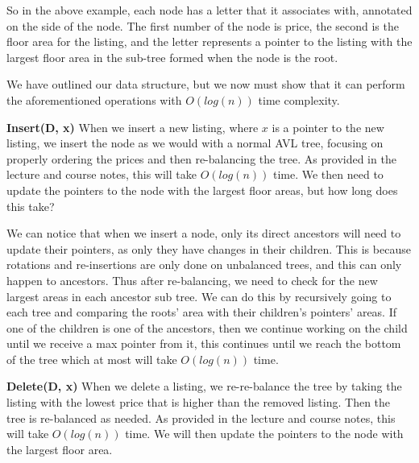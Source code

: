 \documentclass[20pt]{article}
\begin{document}
\noindent
\begin{text}
    So in the above example, each node has a letter that it associates with, annotated on the side of the node. The first number of the node is price, the second is the floor area for the listing, and the letter represents a pointer to the listing with the largest floor area in the sub-tree formed when the node is the root.
\end{text}

\noindent
\begin{text}
    We have outlined our data structure, but we now must show that it can perform the aforementioned operations with $O(log(n))$ time complexity.
    
    \noindent
    \textbf{Insert(D, x)}
    When we insert a new listing, where $x$ is a pointer to the new listing, we insert the node as we would with a normal AVL tree, focusing on properly ordering the prices and then re-balancing the tree. As provided in the lecture and course notes, this will take $O(log(n))$ time. We then need to update the pointers to the node with the largest floor areas, but how long does this take?
    
    \noindent
    We can notice that when we insert a node, only its direct ancestors will need to update their pointers, as only they have changes in their children. This is because rotations and re-insertions are only done on unbalanced trees, and this can only happen to ancestors. Thus after re-balancing, we need to check for the new largest areas in each ancestor sub tree. We can do this by recursively going to each tree and comparing the roots' area with their children's pointers' areas. If one of the children is one of the ancestors, then we continue working on the child until we receive a max pointer from it, this continues until we reach the bottom of the tree which at most will take $O(log(n))$ time.
    
    \noindent
    \textbf{Delete(D, x)}
    When we delete a listing, we re-re-balance the tree by taking the listing with the lowest price that is higher than the removed listing. Then the tree is re-balanced as needed. As provided in the lecture and course notes, this will take $O(log(n))$ time. We will then update the pointers to the node with the largest floor area.
    

\end{text}
\end{document}
